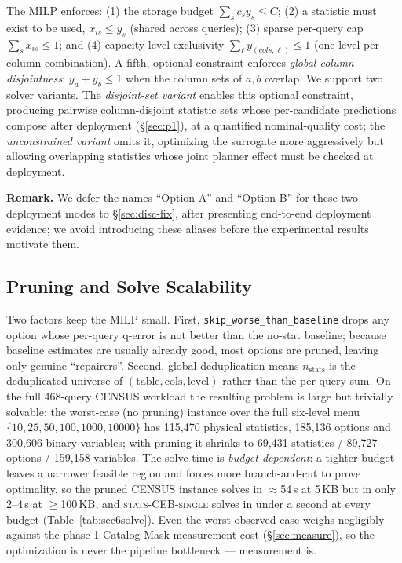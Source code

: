 \documentclass[sigconf, nonacm]{acmart}
\newcommand{\capmenu}{\{10,\allowbreak 25,\allowbreak 50,\allowbreak 100,\allowbreak 1000,\allowbreak 10000\}}
\begin{document}
The MILP enforces: (1) the storage budget $\sum_s c_s y_s\le C$; (2) a statistic
must exist to be used, $x_{is}\le y_s$ (shared across queries); (3) sparse
per-query cap $\sum_s x_{is}\le 1$; and (4) capacity-level exclusivity
$\sum_{\ell} y_{(cols,\ell)}\le 1$ (one level per column-combination). A fifth,
optional constraint enforces \emph{global column disjointness}: $y_a+y_b\le 1$
when the column sets of $a,b$ overlap. We support two solver variants. The
\emph{disjoint-set variant} enables this optional constraint, producing
pairwise column-disjoint statistic sets whose per-candidate predictions compose
after deployment (\S\ref{sec:p1}), at a quantified nominal-quality cost; the
\emph{unconstrained variant} omits it, optimizing the surrogate more
aggressively but allowing overlapping statistics whose joint planner effect must
be checked at deployment.

\textbf{Remark.} We defer the names ``Option-A'' and ``Option-B'' for these two
deployment modes to \S\ref{sec:disc-fix}, after presenting end-to-end
deployment evidence; we avoid introducing these aliases before the experimental
results motivate them.

\subsection{Pruning and Solve Scalability}
\label{sec:scale}

Two factors keep the MILP small. First,
\texttt{skip\_}\allowbreak\texttt{worse\_}\allowbreak\texttt{than\_baseline}
drops any option whose per-query q-error is not better than the no-stat
baseline; because baseline estimates are usually already good, most options are
pruned, leaving only genuine ``repairers''. Second, global deduplication means
$n_{\text{stats}}$ is the deduplicated universe of
$(\text{table},\text{cols},\text{level})$ rather than the per-query sum. On the
full 468-query CENSUS workload the resulting problem is large but trivially
solvable: the worst-case (no pruning) instance over the full six-level menu
$\capmenu$ has 115{,}470 physical
statistics, 185{,}136 options and 300{,}606 binary variables; with pruning it
shrinks to 69{,}431 statistics / 89{,}727 options / 159{,}158 variables. The
solve time is \emph{budget-dependent}: a tighter budget leaves a narrower
feasible region and forces more branch-and-cut to prove optimality, so the
pruned CENSUS instance solves in $\approx$54\,s at 5\,KB but in only $2$--$4$\,s
at $\ge$100\,KB, and \textsc{stats-CEB-single} solves in under a second at
every budget (Table~\ref{tab:sec6solve}). Even the worst observed case weighs
negligibly against the phase-1 Catalog-Mask measurement cost
(\S\ref{sec:measure}), so the optimization is never the pipeline bottleneck ---
measurement is.
\end{document}
